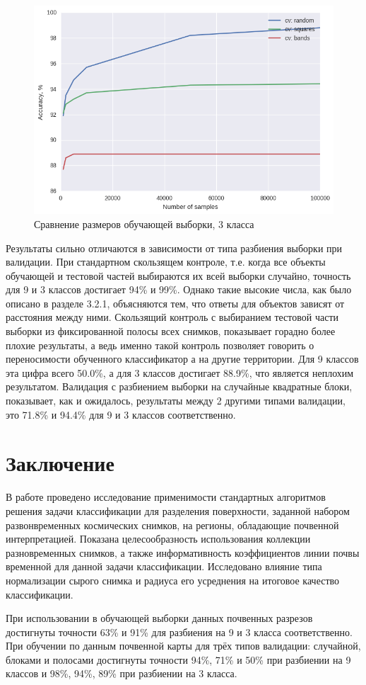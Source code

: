 \documentclass[14pt]{extarticle}
\begin{document}
\begin{figure}[H]
\centering
\includegraphics[width=\linewidth]{imgs/map_validations_3_classes.png}
\caption{Сравнение размеров обучающей выборки, 3 класса}
\label{image:map_val_3}
\end{figure}
Результаты сильно отличаются в зависимости от типа разбиения выборки при валидации.
При стандартном скользящем контроле, т.е. когда все объекты обучающей и тестовой частей
выбираются их всей выборки случайно, точность для 9 и 3 классов достигает 94\% и 99\%.
Однако такие высокие числа, как было описано в разделе 3.2.1, объясняются тем, что ответы
для объектов зависят от расстояния между ними. Скользящий контроль с выбиранием тестовой части
выборки из фиксированной полосы всех снимков, показывает горадно более плохие результаты, а 
ведь именно такой контроль позволяет говорить о переносимости обученного классификатор а на 
другие территории. Для 9 классов эта цифра всего 50.0\%, а для 3 классов достигает
88.9\%, что является неплохим результатом. Валидация с разбиением выборки на 
случайные квадратные блоки, показывает, как и ожидалось, результаты между
2 другими типами валидации, это 71.8\% и 94.4\% для 9 и 3 классов соответственно.

\section{Заключение}

\par
В работе проведено исследование применимости стандартных алгоритмов решения задачи классификации
для разделения поверхности, заданной набором развонвременных космических снимков, на регионы,
обладающие почвенной интерпретацией. Показана целесообразность использования коллекции
разновременных снимков, а также информативность коэффициентов линии почвы временной для
данной задачи классификации. Исследовано влияние типа нормализации сырого снимка
и радиуса его усреднения на итоговое качество классификации.
\par
При использовании в обучающей выборки данных почвенных разрезов достигнуты точности 63\% и 
91\% для разбиения на 9 и 3 класса соответственно. При обучении по данным почвенной карты
для трёх типов валидации: случайной, блоками и полосами достигнуты точности 94\%, 71\% и 50\%
при разбиении на 9 классов и 98\%, 94\%, 89\% при разбиении на 3 класса.
\end{document}
